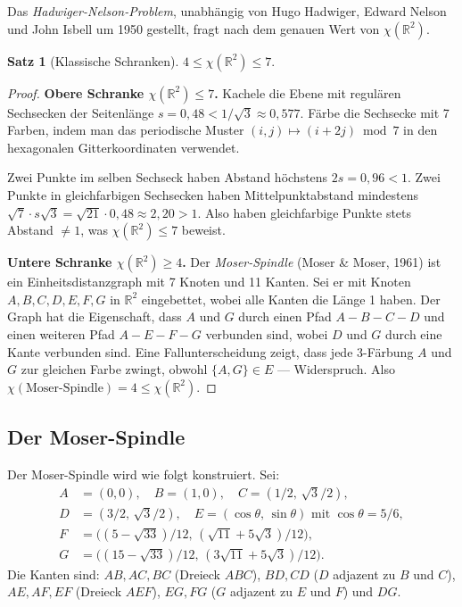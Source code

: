 \documentclass[12pt,a4paper]{amsart}
\newtheorem{theorem}{Satz}[section]
\theoremstyle{definition}
\theoremstyle{remark}
\newcommand{\R}{\mathbb{R}}
\newcommand{\chr}{\chi}
\begin{document}
Das \emph{Hadwiger-Nelson-Problem}, unabhängig von Hugo Hadwiger, Edward Nelson
und John Isbell um 1950 gestellt, fragt nach dem genauen Wert von $\chr(\R^2)$.

\begin{theorem}[Klassische Schranken]
\label{satz:hn-klassisch}
$4 \le \chr(\R^2) \le 7.$
\end{theorem}

\begin{proof}
\textbf{Obere Schranke $\chr(\R^2) \le 7$.}
Kachele die Ebene mit regulären Sechsecken der Seitenlänge $s = 0{,}48 <
1/\sqrt{3} \approx 0{,}577$. Färbe die Sechsecke mit 7 Farben, indem man das
periodische Muster $(i,j) \mapsto (i + 2j) \bmod 7$ in den hexagonalen
Gitterkoordinaten verwendet.

Zwei Punkte im selben Sechseck haben Abstand höchstens $2s = 0{,}96 < 1$.
Zwei Punkte in gleichfarbigen Sechsecken haben Mittelpunktabstand mindestens
$\sqrt{7} \cdot s\sqrt{3} = \sqrt{21} \cdot 0{,}48 \approx 2{,}20 > 1$.
Also haben gleichfarbige Punkte stets Abstand $\ne 1$, was $\chr(\R^2) \le 7$
beweist.

\textbf{Untere Schranke $\chr(\R^2) \ge 4$.}
Der \emph{Moser-Spindle} (Moser \& Moser, 1961) ist ein Einheitsdistanzgraph
mit 7 Knoten und 11 Kanten. Sei er mit Knoten $A, B, C, D, E, F, G$ in $\R^2$
eingebettet, wobei alle Kanten die Länge 1 haben. Der Graph hat die Eigenschaft,
dass $A$ und $G$ durch einen Pfad $A - B - C - D$ und einen weiteren Pfad
$A - E - F - G$ verbunden sind, wobei $D$ und $G$ durch eine Kante verbunden
sind. Eine Fallunterscheidung zeigt, dass jede 3-Färbung $A$ und $G$ zur
gleichen Farbe zwingt, obwohl $\{A, G\} \in E$ --- Widerspruch. Also
$\chr(\text{Moser-Spindle}) = 4 \le \chr(\R^2)$.
\end{proof}

\subsection{Der Moser-Spindle}

Der Moser-Spindle wird wie folgt konstruiert. Sei:
\begin{align*}
  A &= (0, 0), \quad B = (1, 0), \quad C = (1/2,\, \sqrt{3}/2),\\
  D &= (3/2,\, \sqrt{3}/2), \quad E = (\cos\theta,\, \sin\theta)
      \text{ mit } \cos\theta = 5/6,\\
  F &= \bigl((5-\sqrt{33})/12,\, (\sqrt{11}+5\sqrt{3})/12\bigr),\\
  G &= \bigl((15-\sqrt{33})/12,\, (3\sqrt{11}+5\sqrt{3})/12\bigr).
\end{align*}
Die Kanten sind: $AB, AC, BC$ (Dreieck $ABC$), $BD, CD$ ($D$ adjazent zu
$B$ und $C$), $AE, AF, EF$ (Dreieck $AEF$), $EG, FG$ ($G$ adjazent zu
$E$ und $F$) und $DG$.
\end{document}

